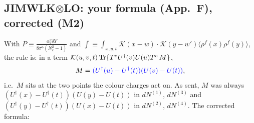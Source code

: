 \documentclass[10pt]{article}
\numberwithin{equation}{section}
\newcommand{\new}[1]{{\color{blue}#1}}
\newcommand{\old}[1]{{\color{red}#1}}
\begin{document}
\subsection{JIMWLK$\otimes$LO: your formula (App.~F), corrected (M2)}
With $P\equiv\frac{\alpha_s^2\delta Y}{8\pi^6(N_c^2-1)}$ and $\int\equiv\int_{x,y,t}\mathcal K(x-w)\cdot\mathcal K(y-w')\langle\rho^f(x)\rho^f(y)\rangle$, the rule is: in a term $\mathcal K(u,v,t)\,{\rm Tr}\{T^eU^\dagger(v)U(u)T^e\,M\}$,
\begin{equation*}
M=\new{(U^\dagger(u)-U^\dagger(t))(U(v)-U(t))},
\end{equation*}
i.e.\ $M$ sits at the two points the colour charges act on. As sent, $M$ was always \old{$(U^\dagger(x)-U^\dagger(t))(U(y)-U(t))$} in $dN^{(1)}$, $dN^{(3)}$ and \old{$(U^\dagger(y)-U^\dagger(t))(U(x)-U(t))$} in $dN^{(2)}$, $dN^{(4)}$. The corrected formula:
\end{document}
